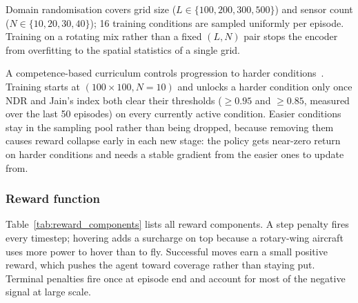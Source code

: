 Domain randomisation covers grid size ($L \in \{100, 200, 300, 500\}$) and sensor count ($N \in \{10, 20, 30, 40\}$); 16 training conditions are sampled uniformly per episode. Training on a rotating mix rather than a fixed $(L, N)$ pair stops the encoder from overfitting to the spatial statistics of a single grid.

A competence-based curriculum controls progression to harder conditions~\cite{bengio2009curriculum}. Training starts at $(100{\times}100, N{=}10)$ and unlocks a harder condition only once NDR and Jain's index both clear their thresholds ($\ge 0.95$ and $\ge 0.85$, measured over the last 50 episodes) on every currently active condition. Easier conditions stay in the sampling pool rather than being dropped, because removing them causes reward collapse early in each new stage: the policy gets near-zero return on harder conditions and needs a stable gradient from the easier ones to update from.

\subsubsection{Reward function}
\label{sec:reward_fn}

Table~\ref{tab:reward_components} lists all reward components.
A step penalty fires every timestep; hovering adds a surcharge on top
because a rotary-wing aircraft uses more power to hover than to fly.
Successful moves earn a small positive reward, which pushes the agent
toward coverage rather than staying put. Terminal penalties fire once
at episode end and account for most of the negative signal at large
scale.

